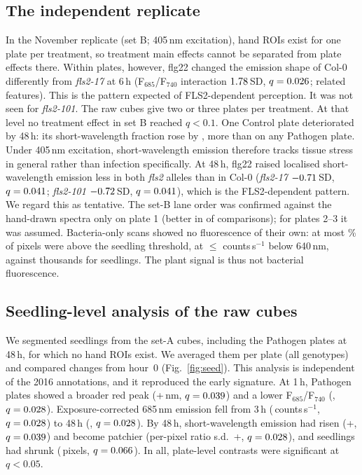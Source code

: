 \documentclass[11pt,a4paper]{article}
\begin{document}
\subsection{The independent replicate}
In the November replicate (set B; 405\,nm excitation), hand ROIs exist for one plate per
treatment, so treatment main effects cannot be separated from plate effects there. Within
plates, however, flg22 changed the emission shape of Col-0 differently from \textit{fls2-17}
at 6\,h (F$_{685}$/F$_{740}$ interaction $1.78$\,SD, $q=0.026$; \setBinterN{}
related features). This is the pattern expected of FLS2-dependent perception. It was not seen
for \textit{fls2-101}. The raw cubes give two or three plates per treatment. At that level no
treatment effect in set B reached $q<0.1$. One Control plate deteriorated by 48\,h: its
short-wavelength fraction rose by \setBctrlTwoSw{}, more than on any Pathogen plate. Under
405\,nm excitation, short-wavelength emission therefore tracks tissue stress in general rather
than infection specifically. At 48\,h, flg22 raised localised short-wavelength emission less in
both \textit{fls2} alleles than in Col-0 (\textit{fls2-17} $-0.71$\,SD,
$q=0.041$; \textit{fls2-101} $-0.72$\,SD,
$q=0.041$), which is the FLS2-dependent pattern. We regard this as tentative. The
set-B lane order was confirmed against the hand-drawn spectra only on plate 1 (better in
\setBdirWins{} of \setBdirN{} comparisons); for plates 2--3 it was assumed. Bacteria-only scans
showed no fluorescence of their own: at most \bactMaxSigPct\% of pixels were above the seedling
threshold, at $\leq$\bactMaxSwCps{} counts\,s$^{-1}$ below 640\,nm, against thousands for
seedlings. The plant signal is thus not bacterial fluorescence.

\subsection{Seedling-level analysis of the raw cubes}
We segmented \nSeedA{} seedlings from the set-A cubes, including the Pathogen plates at 48\,h, for
which no hand ROIs exist. We averaged them per plate (all genotypes) and compared changes from
hour~0 (Fig.~\ref{fig:seed}). This analysis is independent of the 2016 annotations, and it
reproduced the early signature. At 1\,h, Pathogen plates showed a broader red peak
(+\pathSeedFwhmOne{}\,nm, $q=0.039$) and a lower F$_{685}$/F$_{740}$
(\pathSeedRatioOne, $q=0.028$). Exposure-corrected 685\,nm emission fell from
3\,h (\pathSeedCpsThree{}\,counts\,s$^{-1}$, $q=0.028$) to 48\,h
(\pathSeedCpsFortyEight{}, $q=0.028$). By 48\,h, short-wavelength emission had
risen (+\pathSeedSwFortyEight, $q=0.039$) and become patchier (per-pixel ratio
s.d.\ +\pathSeedHetFortyEight, $q=0.028$), and seedlings had shrunk
(\pathSeedAreaFortyEight{}\,pixels, $q=0.066$). In all, \nSeedSigA{}
plate-level contrasts were significant at $q<0.05$.
\end{document}
